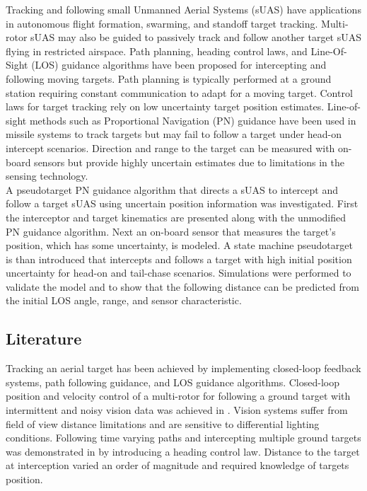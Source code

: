 \documentclass[conference]{IEEEtran}
\begin{document}
Tracking and following small Unmanned Aerial Systems (sUAS) have applications in autonomous flight formation, swarming, and standoff target tracking. Multi-rotor sUAS may also be guided to passively track and follow another target sUAS flying in restricted airspace. Path planning, heading control laws, and Line-Of-Sight (LOS) guidance algorithms have been proposed for intercepting and following moving targets. Path planning is typically performed at a ground station requiring constant communication to adapt for a moving target. Control laws for target tracking rely on low uncertainty target position estimates. Line-of-sight methods such as Proportional Navigation (PN) guidance have been used in missile systems to track targets but may fail to follow a target under head-on intercept scenarios. Direction and range to the target can be measured with on-board sensors but provide highly uncertain estimates due to limitations in the sensing technology. \\

A pseudotarget PN guidance algorithm that directs a sUAS to intercept and follow a target sUAS using uncertain position information was investigated. First the interceptor and target kinematics are presented along with the unmodified PN guidance algorithm. Next an on-board sensor that measures the target's position, which has some uncertainty, is modeled. A state machine pseudotarget is than introduced that intercepts and follows a target with high initial position uncertainty for head-on and tail-chase scenarios. Simulations were performed to validate the model and to show that the following distance can be predicted from the initial LOS angle, range, and sensor characteristic.



\subsection{Literature}
Tracking an aerial target has been achieved by implementing closed-loop feedback systems, path following guidance, and LOS guidance algorithms. Closed-loop position and velocity control of a multi-rotor for following a ground target with intermittent and noisy vision data was achieved in \cite{teuliere_chasing_2011}. Vision systems suffer from field of view distance limitations and are sensitive to differential lighting conditions. Following time varying paths and intercepting multiple ground targets was demonstrated in \cite{oliveira_moving_2016} by introducing a heading control law. Distance to the target at interception varied an order of magnitude and required knowledge of targets position. 
\end{document}
